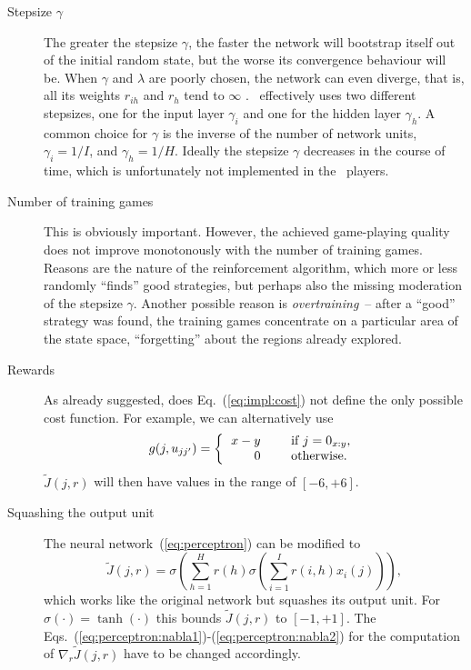 \begin{description}
\item[Stepsize $\gamma$] The greater the stepsize $\gamma$, the faster the network will bootstrap itself out of the initial random state, but the worse its convergence behaviour will be. When $\gamma$ and $\lambda$ are poorly chosen, the network can even diverge, that is, all its weights $r_{ih}$ and $r_h$ tend to $\infty$ . \Malin\ effectively uses two different stepsizes, one for the input layer $\gamma_i$ and one for the hidden layer $\gamma_h$. A common choice for $\gamma$ is the inverse of the number of network units, $\gamma_i = 1/I$, and $\gamma_h = 1/H$. Ideally the stepsize $\gamma$ decreases in the course of time, which is unfortunately not implemented in the \Malin\ players.

\item[Number of training games] This is obviously important. However, the achieved game-playing quality does not improve monotonously with the number of training games. Reasons are the nature of the reinforcement algorithm, which more or less randomly ``finds'' good strategies, but perhaps also the missing moderation of the stepsize $\gamma$. Another possible reason is \emph{overtraining}~-- after a ``good'' strategy was found, the training games concentrate on a particular area of the state space, ``forgetting'' about the regions already explored.

\item[Rewards] As already suggested, does Eq.~(\ref{eq:impl:cost}) not define the only possible cost function. For example, we can alternatively use
\begin{equation}
 g(j,u_{jj'}) = \left \{
\begin{tabular}{rcl}
$x-y$ & & if $j = 0_{x:y}$, \\
0 & \qquad & otherwise. \\
\end{tabular}
\right . 
\end{equation}
$\tilde J(j,r)$ will then have values in the range of $[-6,+6]$.

\item[Squashing the output unit] The neural network~(\ref{eq:perceptron}) can be modified to 
$$\tilde J(j,r) = \sigma \left(\sum_{h=1}^H r(h) \sigma\left ( \sum_{i=1}^I r(i,h) x_i(j) \right )\right), $$
which works like the original network but squashes its output unit.
For $\sigma(\cdot) = \tanh(\cdot)$ this bounds $\tilde J(j,r)$ to $[-1,+1]$. The Eqs.~(\ref{eq:perceptron:nabla1})-(\ref{eq:perceptron:nabla2}) for the computation of $\nabla_r \tilde J(j,r)$ have to be changed accordingly.


\end{description}
